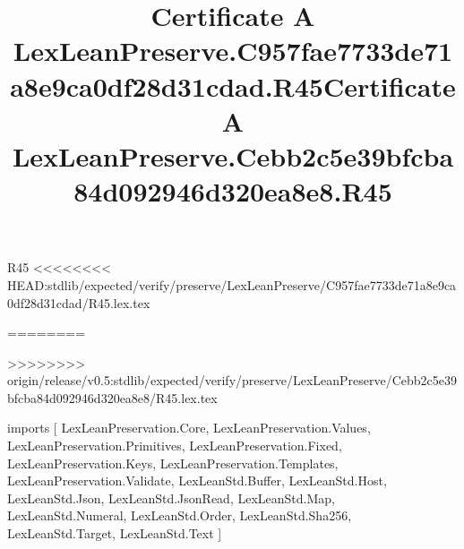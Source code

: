 \begin{lexlean}{R45}
<<<<<<<< HEAD:stdlib/expected/verify/preserve/LexLeanPreserve/C957fae7733de71a8e9ca0df28d31cdad/R45.lex.tex
\title{Certificate A LexLeanPreserve.C957fae7733de71a8e9ca0df28d31cdad.R45}
========
\title{Certificate A LexLeanPreserve.Cebb2c5e39bfcba84d092946d320ea8e8.R45}
>>>>>>>> origin/release/v0.5:stdlib/expected/verify/preserve/LexLeanPreserve/Cebb2c5e39bfcba84d092946d320ea8e8/R45.lex.tex
\begin{coremodule}
imports [
  LexLeanPreservation.Core,
  LexLeanPreservation.Values,
  LexLeanPreservation.Primitives,
  LexLeanPreservation.Fixed,
  LexLeanPreservation.Keys,
  LexLeanPreservation.Templates,
  LexLeanPreservation.Validate,
  LexLeanStd.Buffer,
  LexLeanStd.Host,
  LexLeanStd.Json,
  LexLeanStd.JsonRead,
  LexLeanStd.Map,
  LexLeanStd.Numeral,
  LexLeanStd.Order,
  LexLeanStd.Sha256,
  LexLeanStd.Target,
  LexLeanStd.Text
]


\end{coremodule}
\end{lexlean}
